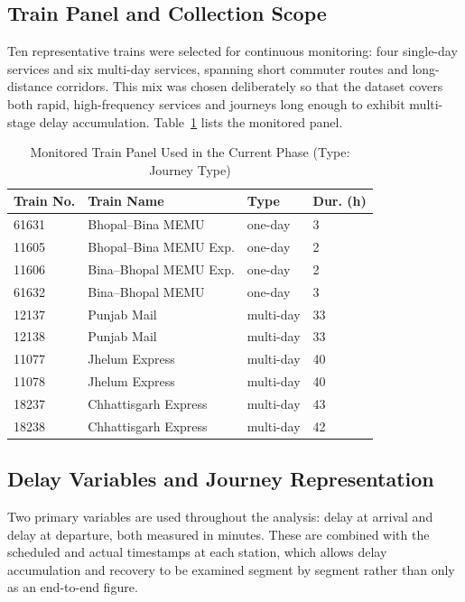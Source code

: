 \documentclass[conference]{IEEEtran}
\begin{document}
\subsection{Train Panel and Collection Scope}
Ten representative trains were selected for continuous monitoring: four single-day services and six multi-day services, spanning short commuter routes and long-distance corridors. This mix was chosen deliberately so that the dataset covers both rapid, high-frequency services and journeys long enough to exhibit multi-stage delay accumulation. Table~\ref{tab:trains} lists the monitored panel.

\begin{table}[!t]
\centering
\caption{Monitored Train Panel Used in the Current Phase (Type: Journey Type)}
\label{tab:trains}
\footnotesize
\setlength{\tabcolsep}{3.5pt}
\begin{tabular}{@{}p{}p{}p{}p{}@{}}
\toprule
Train No. & Train Name & Type & Dur. (h) \\
\midrule
61631 & Bhopal--Bina MEMU & one-day & 3 \\
11605 & Bhopal--Bina MEMU Exp. & one-day & 2 \\
11606 & Bina--Bhopal MEMU Exp. & one-day & 2 \\
61632 & Bina--Bhopal MEMU & one-day & 3 \\
12137 & Punjab Mail & multi-day & 33 \\
12138 & Punjab Mail & multi-day & 33 \\
11077 & Jhelum Express & multi-day & 40 \\
11078 & Jhelum Express & multi-day & 40 \\
18237 & Chhattisgarh Express & multi-day & 43 \\
18238 & Chhattisgarh Express & multi-day & 42 \\
\bottomrule
\end{tabular}
\end{table}

\subsection{Delay Variables and Journey Representation}
Two primary variables are used throughout the analysis: delay at arrival and delay at departure, both measured in minutes. These are combined with the scheduled and actual timestamps at each station, which allows delay accumulation and recovery to be examined segment by segment rather than only as an end-to-end figure.
\end{document}
